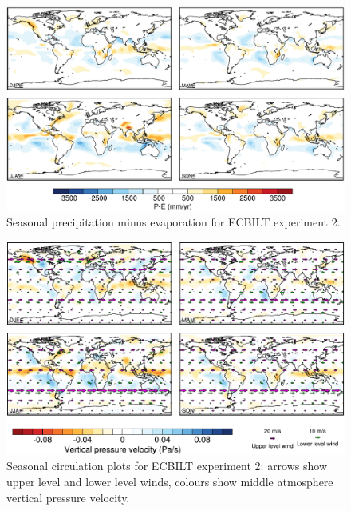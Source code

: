 \documentclass[a4paper,11pt]{article}
\begin{document}
\begin{figure}
  \begin{center}
    \includegraphics[width=\textwidth]{../expt-2/plots/pmine-plots}
  \end{center}
  \caption{Seasonal precipitation minus evaporation for ECBILT
    experiment 2.}
  \label{fig:pmine-2}
\end{figure}

\begin{figure}
  \begin{center}
    \includegraphics[width=\textwidth]{../expt-2/plots/wind-plots}
  \end{center}
  \caption{Seasonal circulation plots for ECBILT experiment 2: arrows
    show upper level and lower level winds, colours show middle
    atmosphere vertical pressure velocity.}
  \label{fig:wind-2}
\end{figure}
\end{document}
